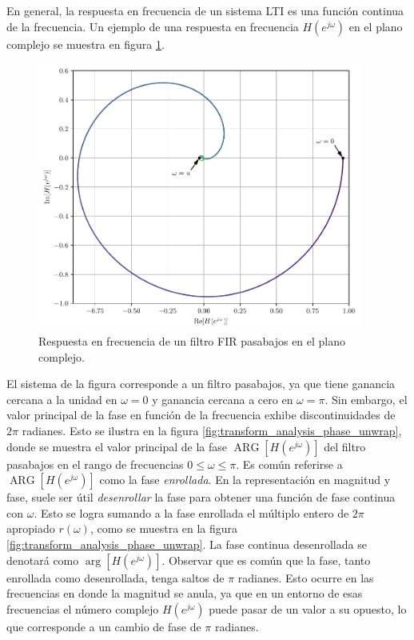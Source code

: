 \documentclass[a4paper]{report}
\DeclareMathOperator{\ARG}{ARG}
\begin{document}
En general, la respuesta en frecuencia de un sistema LTI es una función continua de la frecuencia. Un ejemplo de una respuesta en frecuencia \(H(e^{j\omega})\) en el plano complejo se muestra en figura \ref{fig:transform_analysis_phase_unwrap_z_plane}.
\begin{figure}[!htb]
 \begin{center}
 \includegraphics[width=0.95\textwidth]{figuras/transform_analysis_phase_unwrap_z_plane.pdf}
 \caption{\label{fig:transform_analysis_phase_unwrap_z_plane} Respuesta en frecuencia de un filtro FIR pasabajos en el plano complejo.}
 \end{center}
\end{figure}
El sistema de la figura corresponde a un filtro pasabajos, ya que tiene ganancia cercana a la unidad en \(\omega=0\) y ganancia cercana a cero en \(\omega=\pi\). Sin embargo, el valor principal de la fase en función de la frecuencia exhibe discontinuidades de \(2\pi\) radianes. Esto se ilustra en la figura \ref{fig:transform_analysis_phase_unwrap}, donde se muestra el valor principal de la fase \(\ARG[H(e^{j\omega})]\) del filtro pasabajos en el rango de frecuencias \(0\leq\omega\leq\pi\). Es común referirse a \(\ARG[H(e^{j\omega})]\) como la fase \emph{enrollada}. En la representación en magnitud y fase, suele ser útil \emph{desenrollar} la fase para obtener una función de fase continua con \(\omega\). Esto se logra sumando a la fase enrollada el múltiplo entero de \(2\pi\) apropiado \(r(\omega)\), como se muestra en la figura \ref{fig:transform_analysis_phase_unwrap}. La fase continua desenrollada se denotará como \(\arg[H(e^{j\omega})]\). Observar que es común que la fase, tanto enrollada como desenrollada, tenga saltos de \(\pi\) radianes. Esto ocurre en las frecuencias en donde la magnitud se anula, ya que en un entorno de esas frecuencias el número complejo \(H(e^{j\omega})\) puede pasar de un valor a su opuesto, lo que corresponde a un cambio de fase de \(\pi\) radianes.
\end{document}
